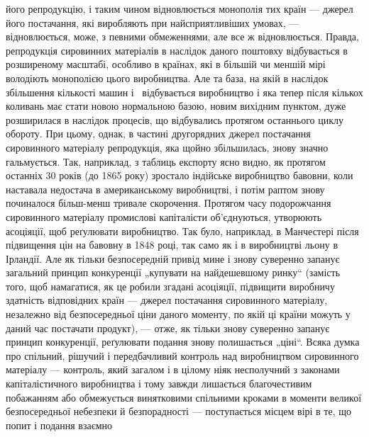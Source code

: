 \parcont{}  %
його репродукцію, і таким чином відновлюється монополія тих
країн — джерел його постачання, які виробляють при найсприятливіших
умовах, — відновлюється, може, з певними обмеженнями,
але все ж відновлюється. Правда, репродукція сировинних
матеріалів в наслідок даного поштовху відбувається в розширеному
масштабі, особливо в країнах, які в більшій чи меншій мірі
володіють монополією цього виробництва. Але та база, на якій в наслідок
збільшення кількості машин і~ відбувається виробництво
і яка тепер після кількох коливань має стати новою нормальною
базою, новим вихідним пунктом, дуже розширилася в наслідок
процесів, що відбувались протягом останнього циклу обороту.
При цьому, однак, в частині другорядних джерел постачання
сировинного матеріалу репродукція, яка щойно збільшилась, знову
значно гальмується. Так, наприклад, з таблиць експорту ясно
видно, як протягом останніх 30 років (до 1865 року) зростало
індійське виробництво бавовни, коли наставала недостача в американському
виробництві, і потім раптом знову починалося
більш-менш тривале скорочення. Протягом часу подорожчання
сировинного матеріалу промислові капіталісти об’єднуються,
утворюють асоціяції, щоб реґулювати виробництво. Так було,
наприклад, в Манчестері після підвищення цін на бавовну в
1848 році, так само як і в виробництві льону в Ірландії. Але як
тільки безпосередній привід мине і знову суверенно запанує загальний
принцип конкуренції „купувати на найдешевшому ринку“
(замість того, щоб намагатися, як це робили згадані асоціяції,
підвищити виробничу здатність відповідних країн — джерел постачання
сировинного матеріалу, незалежно від безпосередньої
ціни даного моменту, по якій ці країни можуть у даний час постачати
продукт), — отже, як тільки знову суверенно запанує
принцип конкуренції, реґулювати подання знову полишається
„ціні“. Всяка думка про спільний, рішучий і передбачливий контроль
над виробництвом сировинного матеріалу — контроль,
який загалом і в цілому ніяк несполучний з законами капіталістичного
виробництва і тому завжди лишається благочестивим
побажанням або обмежується винятковими спільними кроками
в моменти великої безпосередньої небезпеки й безпорадності —
поступається місцем вірі в те, що попит і подання взаємно
